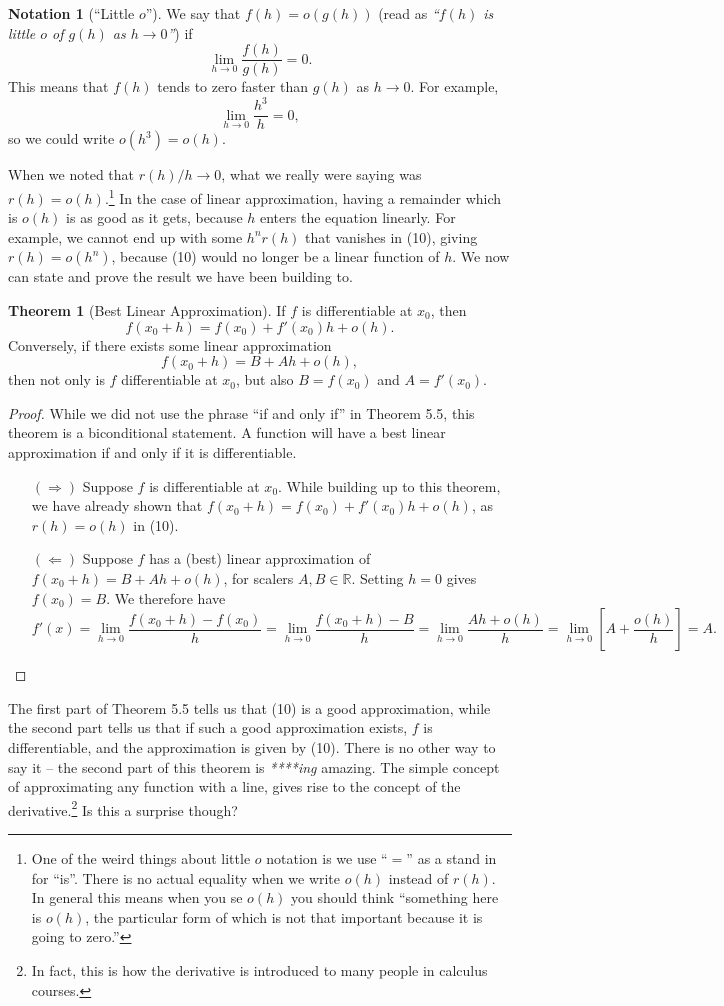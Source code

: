 \documentclass{article}
\newcommand{\R}{\mathbb{R}}
\theoremstyle{definition}
\newtheorem{theorem}{Theorem}[section]
\newtheorem{note}{Notation}[section]
\begin{document}
	\begin{note}[``Little $ o $'']
		We say that $ f(h)=o(g(h)) $ (read as \textit{\color{red}``$ f(h) $ is little $ o $ of $ g(h) $ as $ h\to 0 $''}) if $$ \lim\limits_{h\to 0} \frac{f(h)}{g(h)}=0.$$ This means that $ f(h) $ tends to zero faster than $ g(h) $ as $ h\to 0 $. For example, $$\lim\limits_{h\to 0}\frac{h^3}{h}=0 ,$$ so we could write $ o(h^3)=o(h) $.   
	\end{note}
	When we noted that $ r(h)/h\to 0 $, what we really were saying was $ r(h)=o(h) $.\footnote{One of the weird things about little $ o $ notation is we use ``$ = $'' as a stand in for ``is''. There is no actual equality when we write $ o(h) $ instead of $ r(h) $. In general this means when you se $ o(h) $ you should think ``something here is $ o(h) $, the particular form of which is not that important because it is going to zero.''} In the case of linear approximation, having a remainder which is $ o(h) $ is as good as it gets, because $ h $ enters the equation linearly. For example, we cannot end up with some $ h^nr(h) $ that vanishes in (10), giving $ r(h)=o(h^n) $, because (10) would no longer be a linear function of $ h $. We now can state and prove the result we have been building to.  
	\begin{theorem}[Best Linear Approximation]
		If $ f $ is differentiable at $ x_0 $, then $$f(x_0+h)=f(x_0)+f'(x_0)h+o(h) .$$ Conversely, if there exists some linear approximation $$ f(x_0+h)=B+Ah+o(h) ,$$ then not only is $ f $ differentiable at $ x_0 $, but also $ B=f(x_0) $ and $ A=f'(x_0) $. 
	\end{theorem}
	\begin{proof}
		While we did not use the phrase ``if and only if'' in Theorem 5.5, this theorem is a biconditional statement. A function will have a best linear approximation if and only if it is differentiable.
		\begin{enumerate}
			\item [$ (\Longrightarrow) $] Suppose $ f $ is differentiable at $ x_0 $. While building up to this theorem, we have already shown that $ f(x_0+h)=f(x_0)+f'(x_0)h+o(h) $, as $ r(h)=o(h) $ in (10).
			\item [$ (\Longleftarrow) $] Suppose $ f $ has a (best) linear approximation of $ f(x_0+h)=B+Ah+o(h)$, for scalers $ A,B\in\R $. Setting $ h=0 $ gives $f(x_0)=B $. We therefore have  $$f'(x)=\lim_{h\to0}\frac{f(x_0+h)-f(x_0)}{h}=\lim_{h\to0}\frac{f(x_0+h)-B}{h}=\lim_{h\to0}\frac{Ah+o(h)}{h}=\lim_{h\to0}\left[A+\frac{o(h)}{h}\right]=A .$$ 
		\end{enumerate}
		
	\end{proof}
	The first part of Theorem 5.5 tells us that (10) is a good approximation, while the second part tells us that if such a good approximation exists, $ f $ is differentiable, and the approximation is given by (10). There is no other way to say it -- the second part of this theorem is \textit{****ing} amazing. The simple concept of approximating any function with a line, gives rise to the concept of the derivative.\footnote{In fact, this is how the derivative is introduced to many people in calculus courses.} Is this a surprise though? 
	
\end{document}
